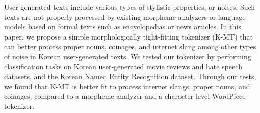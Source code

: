User-generated texts include various types of stylistic properties, or noises. Such texts are not properly processed by existing morpheme analyzers or language models based on formal texts such as encyclopedias or news articles. In this paper, we propose a simple morphologically tight-fitting tokenizer (K-MT) that can better process proper nouns, coinages, and internet slang among other types of noise in Korean user-generated texts. We tested our tokenizer by performing classification tasks on Korean user-generated movie reviews and hate speech datasets, and the Korean Named Entity Recognition dataset. Through our tests, we found that K-MT is better fit to process internet slangs, proper nouns, and coinages, compared to a morpheme analyzer and a character-level WordPiece tokenizer.
